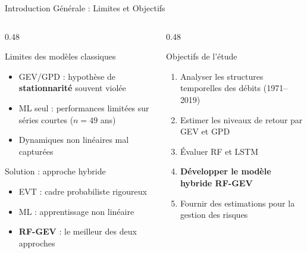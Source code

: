 \documentclass[aspectratio=169, 9pt]{beamer}
\begin{document}
\begin{frame}{Introduction Générale : Limites et Objectifs}
\begin{columns}[T]
\begin{column}{0.48\textwidth}
  \begin{alertblock}{Limites des modèles classiques}
  \small
    \begin{itemize}
      \item GEV/GPD : hypothèse de
            \textbf{stationnarité} souvent violée
      \item ML seul : performances limitées
            sur séries courtes ($n=49$ ans)
      \item Dynamiques non linéaires
            mal capturées
    \end{itemize}
  \end{alertblock}
  \vspace{0.1cm}
  \begin{block}{Solution : approche hybride}
  \small
    \begin{itemize}
      \item EVT : cadre probabiliste rigoureux
      \item ML : apprentissage non linéaire
      \item \textbf{RF-GEV} : le meilleur
            des deux approches
    \end{itemize}
  \end{block}
\end{column}
\begin{column}{0.48\textwidth}
  \begin{block}{Objectifs de l'étude}
  \small
    \begin{enumerate}
      \item Analyser les structures temporelles
            des débits (1971--2019)
      \item Estimer les niveaux de retour
            par GEV et GPD
      \item Évaluer RF et LSTM
      \item \textbf{Développer le modèle
            hybride RF-GEV}
      \item Fournir des estimations pour
            la gestion des risques
    \end{enumerate}
  \end{block}
\end{column}
\end{columns}
\end{frame}
\end{document}
